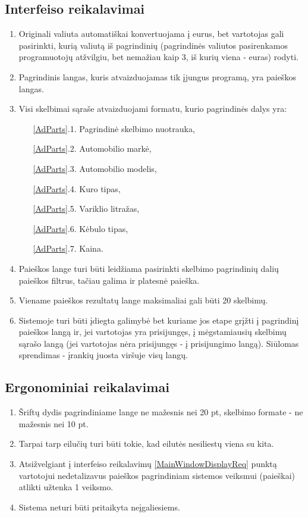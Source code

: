 \documentclass[12pt]{article}
\begin{document}
	\subsection{Interfeiso reikalavimai}	
	\begin{enumerate}
		\item Originali valiuta automatiškai konvertuojama į eurus, bet vartotojas gali pasirinkti, kurią valiutą iš pagrindinių (pagrindinės valiutos pasirenkamos programuotojų atžvilgiu, bet nemažiau kaip 3, iš kurių viena - euras) rodyti.
		\item\label{MainWindowDisplayReq} Pagrindinis langas, kuris atvaizduojamas tik įjungus programą, yra paieškos langas. 
		\item\label{AdParts} Visi skelbimai sąraše atvaizduojami formatu, kurio pagrindinės dalys yra:
		
		\begin{enumerate}
			\item[\ref{AdParts}.1.] Pagrindinė skelbimo nuotrauka,
			\item[\ref{AdParts}.2.] Automobilio markė,
			\item[\ref{AdParts}.3.] Automobilio modelis,
			\item[\ref{AdParts}.4.] Kuro tipas,
			\item[\ref{AdParts}.5.] Variklio litražas,
			\item[\ref{AdParts}.6.] Kėbulo tipas,
			\item[\ref{AdParts}.7.] Kaina.
		\end{enumerate}
		
		\item Paieškos lange turi būti leidžiama pasirinkti skelbimo pagrindinių dalių paieškos filtrus, tačiau galima ir platesnė paieška.
		\item Viename paieškos rezultatų lange maksimaliai gali būti 20 skelbimų.
		\item Sistemoje turi būti įdiegta galimybė bet kuriame jos etape grįžti į pagrindinį paieškos langą ir, jei vartotojas yra prisijungęs, į mėgstamiausių skelbimų sąrašo langą (jei vartotojas nėra prisijungęs - į prisijungimo langą). Siūlomas sprendimas - įrankių juosta viršuje visų langų.
	\end{enumerate}	
	
	\subsection{Ergonominiai reikalavimai}		
	\begin{enumerate}
		\item Šriftų dydis pagrindiniame lange ne mažesnis nei 20 pt, skelbimo formate - ne mažesnis nei 10 pt.
		\item Tarpai tarp eilučių turi būti tokie, kad eilutės nesiliestų viena su kita.
		\item Atsižvelgiant į interfeiso reikalavimų \ref{MainWindowDisplayReq} punktą vartotojui nedetalizavus paieškos pagrindiniam sistemos veiksmui (paieškai) atlikti
užtenka 1 veiksmo.
		\item Sistema neturi būti pritaikyta neįgaliesiems.
	\end{enumerate}
	
\end{document}
